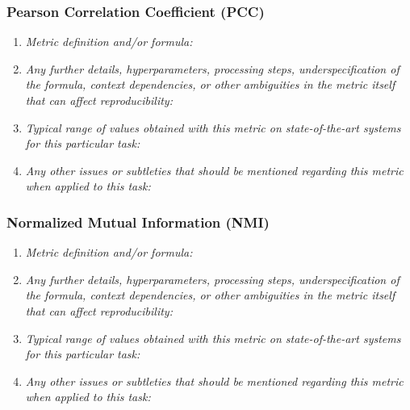 \documentclass[a4paper,11pt]{article}
\begin{document}
        \subsubsection{Pearson Correlation Coefficient (PCC)}
            \begin{enumerate}[label=\alph*.]
                \item \textit{Metric definition and/or formula:}
                \bigskip
                \item \textit{Any further details, hyperparameters, processing steps, underspecification of the formula, context dependencies, or other ambiguities in the metric itself that can affect reproducibility:}
                \bigskip
                \item \textit{Typical range of values obtained with this metric on state-of-the-art systems for this particular task:}
                \bigskip
                \item \textit{Any other issues or subtleties that should be mentioned regarding this metric when applied to this task:}
                \bigskip
            \end{enumerate}
        \subsubsection{Normalized Mutual Information (NMI)}
            \begin{enumerate}[label=\alph*.]
                \item \textit{Metric definition and/or formula:}
                \bigskip
                \item \textit{Any further details, hyperparameters, processing steps, underspecification of the formula, context dependencies, or other ambiguities in the metric itself that can affect reproducibility:}
                \bigskip
                \item \textit{Typical range of values obtained with this metric on state-of-the-art systems for this particular task:}
                \bigskip
                \item \textit{Any other issues or subtleties that should be mentioned regarding this metric when applied to this task:}
                \bigskip
            \end{enumerate}
\end{document}
